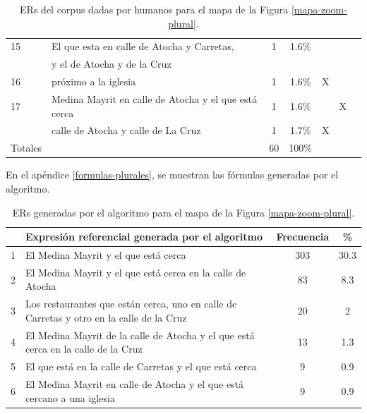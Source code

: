 \begin{table}[h]
{\begin{center}
\begin{tabular}{|l|l|c|c|c|c|c|}
15&El que esta en calle de Atocha y Carretas, 	      &	1	&	1.6\%	&&&\\
&y el de Atocha y de la Cruz	      &		&	&&&\\ \hline


16&pr\'oximo a la iglesia 	      &1		&	1.6\%	&X &&\\ \hline

17&Medina Mayrit en calle de Atocha y el que est\'a cerca  				&  1 &	1.6\%	&&X&\\ \hline
&calle de Atocha y calle de La Cruz  					&1  &	1.7\%	&X&&\\ \hline 
\hline
Totales	&&60	&	100\%	&&&\\

\hline
\end{tabular}
\caption{ERs del corpus dadas por humanos para el mapa de la Figura \ref{mapa-zoom-plural}.}\label{freq-mapa-zoom-plural}
\end{center}
}
\end{table}

En el ap\'endice \ref{formulas-plurales}, se muestran las f\'ormulas generadas por el algoritmo.


\begin{table}[h]
{\footnotesize
\begin{center}
\begin{tabular}{|l|l|c|c|}
\hline
& Expresi\'on referencial generada por el algoritmo & Frecuencia & \%\\
\hline \hline
1& El Medina Mayrit y el que est\'a cerca& 303& 30.3\\ \hline
2& El Medina Mayrit y el que est\'a cerca en la calle de Atocha& 83& 8.3\\\hline
3& Los restaurantes que est\'an cerca, uno en calle de Carretas y otro en la calle de la Cruz&20 & 2 \\ \hline
4& El Medina Mayrit de la calle de Atocha y el que est\'a cerca en la calle de la Cruz&13 &1.3 \\ \hline
5& El que est\'a en la calle de Carretas y el que est\'a cerca & 9& 0.9\\ \hline
6& El Medina Mayrit en calle de Atocha y el que est\'a cercano a una iglesia &9 &0.9 \\

\hline
\end{tabular}
\caption{ERs generadas por el algoritmo para el mapa de la Figura \ref{mapa-zoom-plural}.}\label{freq-mapa-zoom-plural-algoritmo}
\end{center}
}
\end{table}

